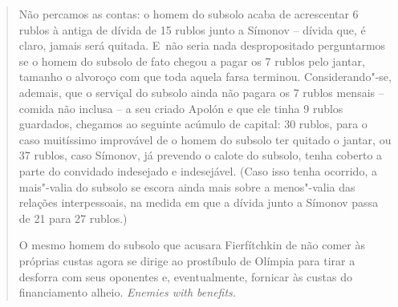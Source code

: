 {\begin{quote}
Não percamos as contas: o homem do subsolo acaba de acrescentar 6 rublos
à antiga de dívida de 15 rublos junto a Símonov -- dívida que, é claro,
jamais será quitada. E~não seria nada despropositado perguntarmos se o
homem do subsolo de fato chegou a pagar os 7 rublos pelo jantar, tamanho
o alvoroço com que toda aquela farsa terminou. Considerando"-se, ademais,
que o serviçal do subsolo ainda não pagara os 7 rublos mensais -- comida
não inclusa -- a seu criado Apolón e que ele tinha 9 rublos guardados,
chegamos ao seguinte acúmulo de capital: 30 rublos, para o caso
muitíssimo improvável de o homem do subsolo ter quitado o jantar, ou 37
rublos, caso Símonov, já prevendo o calote do subsolo, tenha coberto a
parte do convidado indesejado e indesejável. (Caso isso tenha ocorrido,
a mais"-valia do subsolo se escora ainda mais sobre a menos"-valia das
relações interpessoais, na medida em que a dívida junto a Símonov passa
de 21 para 27 rublos.)

O mesmo homem do subsolo que acusara Fierfítchkin de não comer às
próprias custas agora se dirige ao prostíbulo de Olímpia para tirar a
desforra com seus oponentes e, eventualmente, fornicar às custas do
financiamento alheio. \emph{Enemies with benefits. }


\end{quote}}
